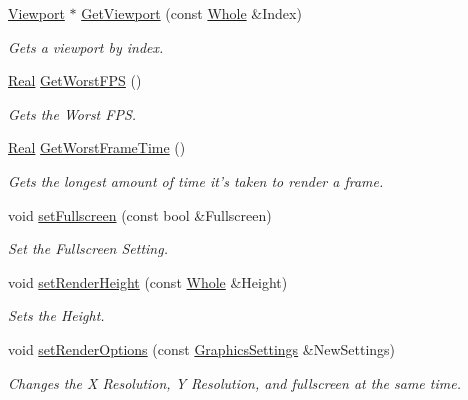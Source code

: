 \begin{DoxyCompactItemize}
\hyperlink{classMezzanine_1_1Viewport}{Viewport} $\ast$ \hyperlink{classMezzanine_1_1GameWindow_ac3ae0f2e4cee0238ae4c158adea1422e}{GetViewport} (const \hyperlink{namespaceMezzanine_adcbb6ce6d1eb4379d109e51171e2e493}{Whole} \&Index)
\begin{DoxyCompactList}\small\item\em Gets a viewport by index. \item\end{DoxyCompactList}\item 
\hyperlink{namespaceMezzanine_a726731b1a7df72bf3583e4a97282c6f6}{Real} \hyperlink{classMezzanine_1_1GameWindow_afd5af20c62dfc0e9ab52fe689f5e8bc8}{GetWorstFPS} ()
\begin{DoxyCompactList}\small\item\em Gets the Worst FPS. \item\end{DoxyCompactList}\item 
\hyperlink{namespaceMezzanine_a726731b1a7df72bf3583e4a97282c6f6}{Real} \hyperlink{classMezzanine_1_1GameWindow_ae07e3a1d5e1ceef524ce29e0c255c78b}{GetWorstFrameTime} ()
\begin{DoxyCompactList}\small\item\em Gets the longest amount of time it's taken to render a frame. \item\end{DoxyCompactList}\item 
void \hyperlink{classMezzanine_1_1GameWindow_a874b538cd9735478f32329c06e832360}{setFullscreen} (const bool \&Fullscreen)
\begin{DoxyCompactList}\small\item\em Set the Fullscreen Setting. \item\end{DoxyCompactList}\item 
void \hyperlink{classMezzanine_1_1GameWindow_a485f45b9265b6fb9d6baae88171b8c74}{setRenderHeight} (const \hyperlink{namespaceMezzanine_adcbb6ce6d1eb4379d109e51171e2e493}{Whole} \&Height)
\begin{DoxyCompactList}\small\item\em Sets the Height. \item\end{DoxyCompactList}\item 
void \hyperlink{classMezzanine_1_1GameWindow_a89368aaeda12eb454ee951a44a65cb8b}{setRenderOptions} (const \hyperlink{structMezzanine_1_1GraphicsSettings}{GraphicsSettings} \&NewSettings)
\begin{DoxyCompactList}\small\item\em Changes the X Resolution, Y Resolution, and fullscreen at the same time. \item\end{DoxyCompactList}\item 

\end{DoxyCompactItemize}
